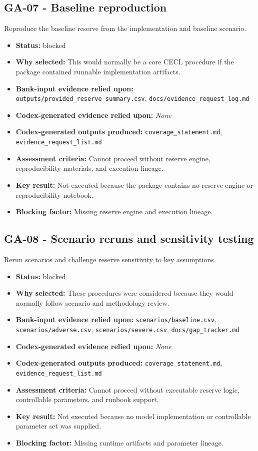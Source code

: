 \documentclass[11pt]{article}
\begin{document}
\subsection*{GA-07 - Baseline reproduction}
Reproduce the baseline reserve from the implementation and baseline scenario.
\begin{itemize}
\item \textbf{Status:} blocked
\item \textbf{Why selected:} This would normally be a core CECL procedure if the package contained runnable implementation artifacts.
\item \textbf{Bank-input evidence relied upon:} \texttt{outputs/provided\_reserve\_summary.csv}, \texttt{docs/evidence\_request\_log.md}
\item \textbf{Codex-generated evidence relied upon:} \textit{None}
\item \textbf{Codex-generated outputs produced:} \texttt{coverage\_statement.md}, \texttt{evidence\_request\_list.md}
\item \textbf{Assessment criteria:} Cannot proceed without reserve engine, reproducibility materials, and execution lineage.
\item \textbf{Key result:} Not executed because the package contains no reserve engine or reproducibility notebook.
\end{itemize}
\begin{itemize}
\item \textbf{Blocking factor:} Missing reserve engine and execution lineage.
\end{itemize}
\subsection*{GA-08 - Scenario reruns and sensitivity testing}
Rerun scenarios and challenge reserve sensitivity to key assumptions.
\begin{itemize}
\item \textbf{Status:} blocked
\item \textbf{Why selected:} These procedures were considered because they would normally follow scenario and methodology review.
\item \textbf{Bank-input evidence relied upon:} \texttt{scenarios/baseline.csv}, \texttt{scenarios/adverse.csv}, \texttt{scenarios/severe.csv}, \texttt{docs/gap\_tracker.md}
\item \textbf{Codex-generated evidence relied upon:} \textit{None}
\item \textbf{Codex-generated outputs produced:} \texttt{coverage\_statement.md}, \texttt{evidence\_request\_list.md}
\item \textbf{Assessment criteria:} Cannot proceed without executable reserve logic, controllable parameters, and runbook support.
\item \textbf{Key result:} Not executed because no model implementation or controllable parameter set was supplied.
\end{itemize}
\begin{itemize}
\item \textbf{Blocking factor:} Missing runtime artifacts and parameter lineage.
\end{itemize}
\end{document}
